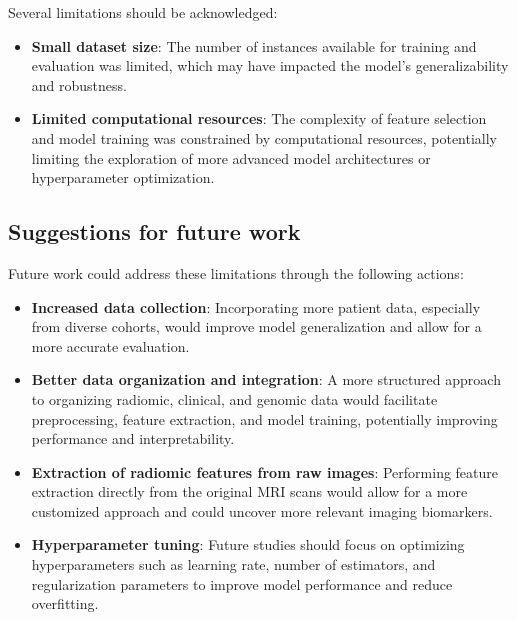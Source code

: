 \documentclass[conference]{IEEEtran}
\begin{document}
Several limitations should be acknowledged:
\begin{itemize}
    \item \textbf{Small dataset size}: The number of instances available for training and evaluation was limited, which may have impacted the model’s generalizability and robustness.
    \item \textbf{Limited computational resources}: The complexity of feature selection and model training was constrained by computational resources, potentially limiting the exploration of more advanced model architectures or hyperparameter optimization.
\end{itemize}

\subsection{Suggestions for future work}

Future work could address these limitations through the following actions:
\begin{itemize}
    \item \textbf{Increased data collection}: Incorporating more patient data, especially from diverse cohorts, would improve model generalization and allow for a more accurate evaluation.
    \item \textbf{Better data organization and integration}: A more structured approach to organizing radiomic, clinical, and genomic data would facilitate preprocessing, feature extraction, and model training, potentially improving performance and interpretability.
    \item \textbf{Extraction of radiomic features from raw images}: Performing feature extraction directly from the original MRI scans would allow for a more customized approach and could uncover more relevant imaging biomarkers.
    \item \textbf{Hyperparameter tuning}: Future studies should focus on optimizing hyperparameters such as learning rate, number of estimators, and regularization parameters to improve model performance and reduce overfitting.
\end{itemize}

\end{document}
